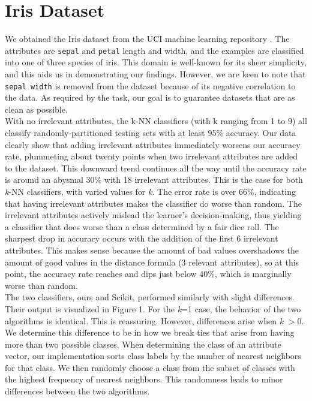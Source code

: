 \documentclass{article}
\begin{document}
\section{Iris Dataset}

We obtained the Iris dataset from the UCI machine learning repository \cite{iris}. The attributes are \texttt{sepal} and \texttt{petal} length and width, and the examples are classified into one of three species of iris. This domain is well-known for its sheer simplicity, and this aids us in demonstrating our findings. However, we are keen to note that \texttt{sepal width} is removed from the dataset because of its negative correlation to the data. As required by the task, our goal is to guarantee datasets that are as clean as possible. \\ 

With no irrelevant attributes, the k-NN classifiers (with k ranging from 1 to 9) all classify randomly-partitioned testing sets with at least 95\% accuracy. Our data clearly show that adding irrelevant attributes immediately worsens our accuracy rate, plummeting about twenty points when two irrelevant attributes are added to the dataset. This downward trend continues all the way until the accuracy rate is around an abysmal 30\% with 18 irrelevant attributes. This is the case for both \textit{k}-NN classifiers, with varied values for \textit{k}. The error rate is over 66\%, indicating that having irrelevant attributes makes the classifier do worse than random. The irrelevant attributes actively mislead the learner's decision-making, thus yielding a classifier that does worse than a class determined by a fair dice roll. The sharpest drop in accuracy occurs with the addition of the first 6 irrelevant attributes. This makes sense because the amount of bad values overshadows the amount of good values in the distance formula (3 relevant attributes), so at this point, the accuracy rate reaches and dips just below 40\%, which is marginally worse than random. \\

The two classifiers, ours and Scikit, performed similarly with slight differences. Their output is visualized in Figure 1. For the \textit{k}=1 case, the behavior of the two algorithms is  identical. This is reassuring. However, differences arise when \textit{k} $>0$. We determine this difference to be in how we break ties that arise from having more than two possible classes. When determining the class of an attribute vector, our implementation sorts class labels by the number of nearest neighbors for that class. We then randomly choose a class from the subset of classes with the highest frequency of nearest neighbors. This randomness leads to minor differences between the two algorithms. 
\end{document}
